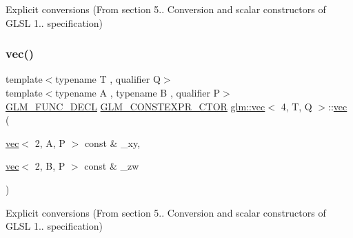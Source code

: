 Explicit conversions (From section 5.. Conversion and scalar constructors of G\+L\+SL 1.. specification) 

\mbox{\label{structglm_1_1vec_3_014_00_01_t_00_01_q_01_4_af18e05d8f9e28ed3dab7cd8b2150fede}} 
\subsubsection{\texorpdfstring{vec()}{vec()}\hspace{0.1cm}{\footnotesize\ttfamily [18/34]}}
{\footnotesize\ttfamily template$<$typename T , qualifier Q$>$ \\
template$<$typename A , typename B , qualifier P$>$ \\
\mbox{\hyperlink{setup_8hpp_ab2d052de21a70539923e9bcbf6e83a51}{G\+L\+M\+\_\+\+F\+U\+N\+C\+\_\+\+D\+E\+CL}} \mbox{\hyperlink{setup_8hpp_ad34178a09666081abdb573c14d1f4a5a}{G\+L\+M\+\_\+\+C\+O\+N\+S\+T\+E\+X\+P\+R\+\_\+\+C\+T\+OR}} \mbox{\hyperlink{structglm_1_1vec}{glm\+::vec}}$<$ 4, T, Q $>$\+::\mbox{\hyperlink{structglm_1_1vec}{vec}} (\begin{DoxyParamCaption}\item[{\mbox{\hyperlink{structglm_1_1vec}{vec}}$<$ 2, A, P $>$ const \&}]{\+\_\+xy,  }\item[{\mbox{\hyperlink{structglm_1_1vec}{vec}}$<$ 2, B, P $>$ const \&}]{\+\_\+zw }\end{DoxyParamCaption})}



Explicit conversions (From section 5.. Conversion and scalar constructors of G\+L\+SL 1.. specification) 

\mbox{\label{structglm_1_1vec_3_014_00_01_t_00_01_q_01_4_ad1532b19e40e767e98e2ca54aef6a6f4}} 
